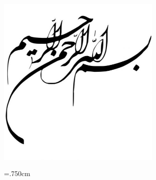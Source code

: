 
\newpage\clearpage

\begin{center}
	\includegraphics[width=0.6\textwidth]{./BaseFile/allah.jpg}
\end{center}
\baselineskip=.750cm
\thispagestyle{empty}



